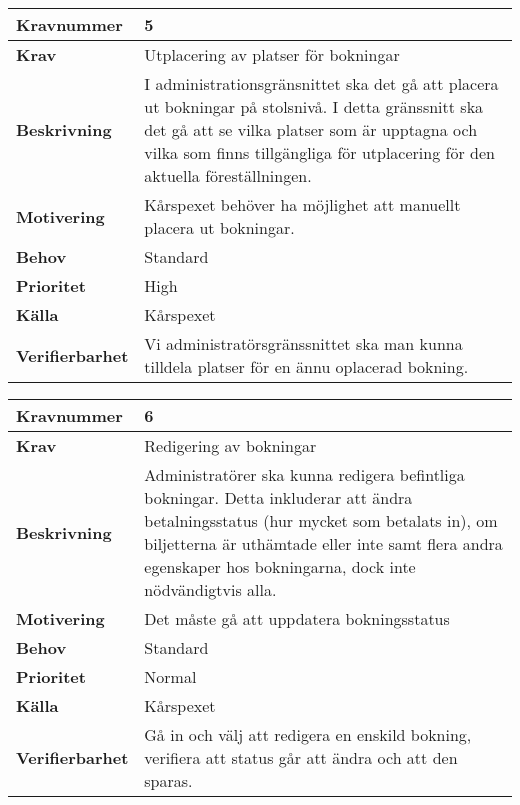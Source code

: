 \documentclass[a4paper, twoside, 11pt, titlepage]{article}
\begin{document}
\begin{tabular} { | p{3cm} | p{12.2cm} | }
	\hline
	\textbf{Kravnummer} & 5  \\
	\hline
	\textbf{Krav} & Utplacering av platser för bokningar  \\
	\hline
	\textbf{Beskrivning} & I administrationsgränsnittet ska det gå att placera ut bokningar på stolsnivå. I detta gränssnitt ska det gå att se vilka platser som är upptagna och vilka som finns tillgängliga för utplacering för den aktuella föreställningen.  \\
	\hline
	\textbf{Motivering} & Kårspexet behöver ha möjlighet att manuellt placera ut bokningar.  \\
	\hline
	\textbf{Behov} & Standard  \\
	\hline
	\textbf{Prioritet} & High  \\
	\hline
	\textbf{Källa} & Kårspexet  \\
	\hline
	\textbf{Verifierbarhet} & Vi administratörsgränssnittet ska man kunna tilldela platser för en ännu oplacerad bokning.  \\
	\hline
\end{tabular}

\begin{tabular} { | p{3cm} | p{12.2cm} | }
	\hline
	\textbf{Kravnummer} & 6  \\
	\hline
	\textbf{Krav} & Redigering av bokningar  \\
	\hline
	\textbf{Beskrivning} & Administratörer ska kunna redigera befintliga bokningar. Detta inkluderar att ändra betalningsstatus (hur mycket som betalats in), om biljetterna är uthämtade eller inte samt flera andra egenskaper hos bokningarna, dock inte nödvändigtvis alla.  \\
	\hline
	\textbf{Motivering} & Det måste gå att uppdatera bokningsstatus  \\
	\hline
	\textbf{Behov} & Standard  \\
	\hline
	\textbf{Prioritet} & Normal  \\
	\hline
	\textbf{Källa} & Kårspexet  \\
	\hline
	\textbf{Verifierbarhet} & Gå in och välj att redigera en enskild bokning, verifiera att status går att ändra och att den sparas.  \\
	\hline
\end{tabular}
\end{document}
